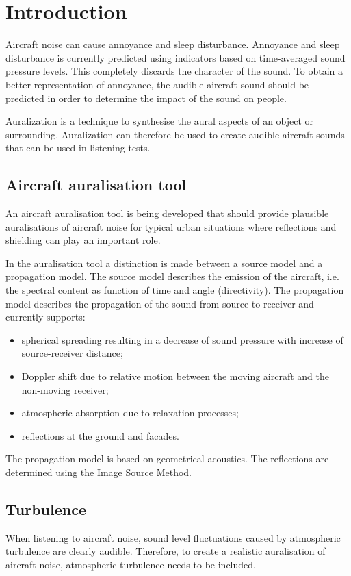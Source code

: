 \section{Introduction}
Aircraft noise can cause annoyance and sleep disturbance. Annoyance and
sleep disturbance is currently predicted using indicators based on time-averaged sound
pressure levels. This completely discards the character of the sound. To obtain a better 
representation of annoyance, the audible aircraft sound should be predicted in order to 
determine the impact of the sound on people.

Auralization is a technique to synthesise the aural aspects of an object or
surrounding. Auralization can therefore be used to create audible aircraft sounds that
can be used in listening tests.

\subsection{Aircraft auralisation tool}
An aircraft auralisation tool is being developed that should provide plausible 
auralisations of aircraft noise for typical urban situations where reflections 
and shielding can play an important role.

In the auralisation tool a distinction is made between a source model and a 
propagation model. The source model describes the emission of the aircraft, i.e. 
the spectral content as function of time and angle (directivity). 
The propagation model describes the propagation of the sound from source to receiver 
and currently supports:
\begin{itemize}
 \item spherical spreading resulting in a decrease of sound pressure with increase of source-receiver distance;
 \item Doppler shift due to relative motion between the moving aircraft and the non-moving receiver;
 \item atmospheric absorption due to relaxation processes;
 \item reflections at the ground and facades.%
\end{itemize}
The propagation model is based on geometrical acoustics. The reflections are determined using the Image Source Method.

\subsection{Turbulence}
When listening to aircraft noise, sound level fluctuations caused by atmospheric 
turbulence are clearly audible. Therefore, to create a realistic auralisation of 
aircraft noise, atmospheric turbulence needs to be included.

